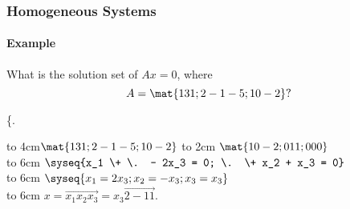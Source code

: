 
\begin{frame}
\frametitle{Homogeneous Systems}
\framesubtitle{Example}

\vskip-3mm
\begin{ques}
  What is the solution set of $Ax=0$, where
  \[ A = \mat{1 3 1; 2 -1 -5; 1 0 -2}? \]
\end{ques}

\spalignsysdelims\{.
\begin{webonly}
\leavevmode
\hbox to 4cm{\hfil$\mat{1 3 1; 2 -1 -5; 1 0 -2}$}%
\hbox to 2cm{\hfil{}}
\quad$\mat{1 0 -2; 0 1 1; 0 0 0}$ \\[2mm]
\leavevmode
\hbox to 6cm{\hfil\longsquiggly[equations]}\quad 
$\syseq{x_1 \+ \. - 2x_3 = 0; \. \+ x_2 + x_3 = 0}$\\[2mm]
\leavevmode
\hbox to 6cm{\hfil{}}\quad 
$\syseq{
  x_1 = 2x_3; 
  x_2 = -x_3; 
  x_3 = x_3}$\\[2mm]
\leavevmode
\hbox to 6cm{\hfil{}}\quad 
$x = \vec{x_1 x_2 x_3} = x_3\vec{2 -1 1}$.
\end{webonly}

\end{frame}



